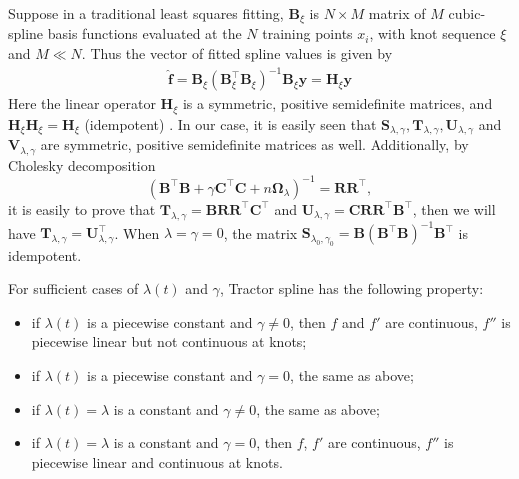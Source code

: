 Suppose in a traditional least squares fitting, $\mathbf{B}_\xi$ is $N \times M$ matrix of $M$ cubic-spline basis functions evaluated at the $N$ training points $x_i$, with knot sequence $\xi$ and $M \ll N$. Thus the vector of fitted spline values is given by
\begin{align}\label{fhy}
\hat{\mathbf{f}}=\mathbf{B}_\xi(\mathbf{B}^\top_\xi\mathbf{B}_\xi)^{-1}\mathbf{B}_\xi\mathbf{y}=\mathbf{H}_\xi\mathbf{y}
\end{align}
Here the linear operator $\mathbf{H}_\xi$ is a symmetric, positive semidefinite matrices, and $\mathbf{H}_\xi\mathbf{H}_\xi=\mathbf{H}_\xi$ (idempotent) \cite{esl2009}. In our case, it is easily seen that $\mathbf{S}_{\lambda,\gamma}, \mathbf{T}_{\lambda,\gamma}, \mathbf{U}_{\lambda,\gamma}$ and $\mathbf{V}_{\lambda,\gamma}$ are symmetric, positive semidefinite matrices as well. Additionally, by Cholesky decomposition
\begin{equation}
(\mathbf{B}^\top\mathbf{B}+\gamma\mathbf{C}^\top\mathbf{C}+n\mathbf{\Omega}_{\lambda})^{-1}=\mathbf{R}\mathbf{R}^\top,
\end{equation}
it is easily to prove that $\mathbf{T}_{\lambda,\gamma}=\mathbf{B}\mathbf{R}\mathbf{R}^\top\mathbf{C}^\top$ and $\mathbf{U}_{\lambda,\gamma}=\mathbf{C}\mathbf{R}\mathbf{R}^\top\mathbf{B}^\top$, then we will have 
 $\mathbf{T}_{\lambda,\gamma}= \mathbf{U}_{\lambda,\gamma}^\top$. When $\lambda=\gamma=0$, the matrix $\mathbf{S}_{\lambda_0,\gamma_0}=\mathbf{B}(\mathbf{B}^\top\mathbf{B})^{-1}\mathbf{B}^\top$ is idempotent.  

For sufficient cases of $\lambda(t)$ and $\gamma$, Tractor spline has the following property:
\begin{itemize}
\item if $\lambda(t)$ is a piecewise constant and $\gamma \neq 0$, then $f$ and $f'$ are continuous, $f''$ is piecewise linear but not continuous at knots;
\item if $\lambda(t)$ is a piecewise constant and $\gamma = 0$, the same as above;
\item if $\lambda(t)=\lambda $ is a constant and $\gamma \neq 0$, the same as above;
\item if $\lambda(t)=\lambda $ is a constant and $\gamma = 0$, then $f$, $f'$ are continuous, $f''$ is piecewise linear and continuous at knots.
\end{itemize}

